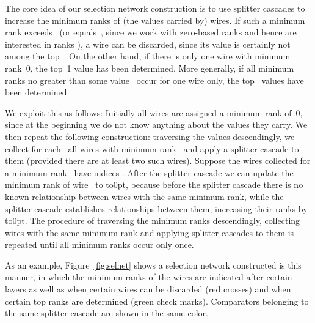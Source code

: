 \documentclass{article}
\begin{document}
\begin{table}[t]
The core idea of our selection network construction is to use splitter
cascades to increase the minimum ranks of (the values carried by) wires.
If such a minimum rank exceeds~ (or equals~, since we work with
zero-based ranks and hence are interested in ranks
), a wire can be discarded, since its value is
certainly not among the top~. On the other hand, if there is only
one wire with minimum rank~0, the top~1 value has been determined.
More generally, if all minimum ranks no greater than some value~
occur for one wire only, the top~ values have been determined.

We exploit this as follows: Initially all wires are assigned a minimum
rank of~0, since at the beginning we do not know anything about the
values they carry. We then repeat the following construction:
traversing the values  descendingly, we collect
for each~ all wires with minimum rank~ and apply a splitter
cascade to them (provided there are at least two such wires).
Suppose the wires collected for a minimum rank~ have indices
. After the splitter cascade
we can update the minimum rank of wire~ to
\hbox{\vbox to0pt{\vss\hbox{}}}, because
before the splitter cascade there is no known relationship between
wires with the same minimum rank, while the splitter cascade
establishes relationships between them, increasing their ranks by
\hbox{\vbox to0pt{\vss\hbox{}}}. The procedure of
traversing the minimum ranks  descendingly,
collecting wires with the same minimum rank and applying splitter
cascades to them is repeated until all minimum ranks 
occur only once.

As an example, Figure~\ref{fig:selnet} shows a  selection
network constructed is this manner, in which the minimum ranks of the
wires are indicated after certain layers as well as when certain wires
can be discarded (red crosses) and when certain top ranks are determined
(green check marks). Comparators belonging to the same splitter cascade
are shown in the same color.



\end{table}
\end{document}
